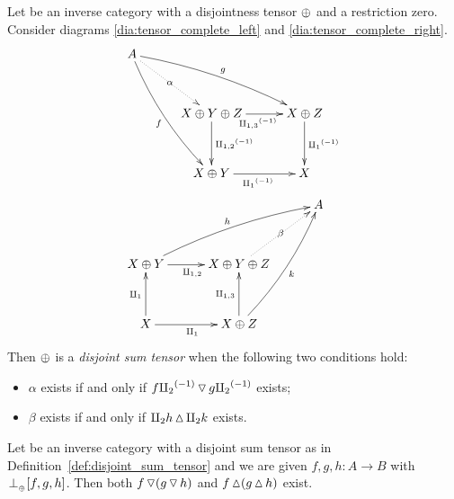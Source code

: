 \begin{definition}\label{def:disjoint_sum_tensor}
  Let \X be an inverse category with a disjointness tensor $\oplus$ and a restriction zero. Consider
  diagrams \ref{dia:tensor_complete_left} and \ref{dia:tensor_complete_right}.
  \begin{align}
    &\xymatrix@C+5pt@R+10pt{
      A \ar@/_/[ddr]_f \ar@/^/[drr]^g \ar@{.>}[dr]|-{\alpha} \\
        & X\+Y\+Z \ar[d]^{\icp{1,2}} \ar[r]_{\icp{1,3}} & X\+Z \ar[d]^{\icpa} \\
        & X\+Y \ar[r]_{\icpa} & X
    } \label{dia:tensor_complete_left}\\
    &\xymatrix@C+5pt@R+10pt{
        &&A \\
         X\+Y \ar[r]_{\cp{1,2}} \ar@/^/[urr]^h &X\+Y\+Z \ar@{.>}[ur]|-{\beta} \\
         X \ar[u]^{\cpa} \ar[r]_{\cpa} & X\+Z \ar[u]^{\cp{1,3}} \ar@/_/[uur]_k
    } \label{dia:tensor_complete_right}
  \end{align}
  Then
  $\oplus$ is a \emph{disjoint sum tensor} when the following two conditions hold:
  \begin{itemize}
    \item $\alpha$ exists if and only if  $f {\amalg_{2}}^{(-1)} \operatorname{\triangledown} g {\amalg_{2}}^{(-1)}$ exists;
    \item $\beta$ exists if and only if $\amalg_{2} h \operatorname{\vartriangle} \amalg_{2} k$ exists.
  \end{itemize}

\end{definition}
\begin{lemma}\label{lem:complete_disjointness_means_multiple_disjoints}
  Let \X be an inverse category with a disjoint sum tensor as in
  Definition~\ref{def:disjoint_sum_tensor} and we are given $f,g,h:A\to B$ with
  ${}_{{}_{}}{\perp_{{}_{\oplus}}}[f,g,h]$. Then both $f \operatorname{\triangledown} (g \operatorname{\triangledown} h)$ and $f\operatorname{\vartriangle}(g\operatorname{\vartriangle} h)$ exist.
\end{lemma}
